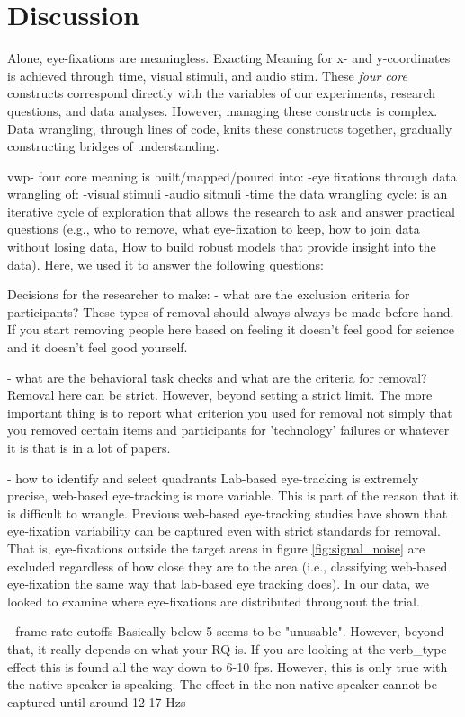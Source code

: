 \section{Discussion}
Alone, eye-fixations are meaningless. Exacting Meaning for x- and y-coordinates is achieved
through time, visual stimuli, and audio stim. These \textit{four core} constructs correspond directly with the variables of our experiments, research questions, and data analyses. However, managing these constructs is complex. Data wrangling, through lines of code, knits these constructs together, gradually constructing bridges of understanding.

vwp- four core
meaning is built/mapped/poured into:
-eye fixations
through data wrangling of:
-visual stimuli
-audio sitmuli
-time
the data wrangling cycle: is an iterative cycle of exploration that allows the research to ask and answer practical questions (e.g., who to remove, what eye-fixation to keep, how to join data without losing data, How to build robust models that provide insight into the data). Here, we used it to answer the following questions:


Decisions for the researcher to make:
- what are the exclusion criteria for participants?
These types of removal should always always be made before hand. If you start removing people here based on feeling it doesn't feel good for science and it doesn't feel good yourself. 


- what are the behavioral task checks and what are the criteria for removal?
Removal here can be strict. However, beyond setting a strict limit. The more important thing is to report what criterion you used for removal not simply that you removed certain items and participants for 'technology' failures or whatever it is that is in a lot of papers.


- how to identify and select quadrants
Lab-based eye-tracking is extremely precise, web-based eye-tracking is more variable. This is part of the reason that it is difficult to wrangle. Previous web-based eye-tracking studies have shown that eye-fixation variability can be captured even with strict standards for removal. That is, eye-fixations outside the target areas in figure \ref{fig:signal_noise} are excluded regardless of how close they are to the area (i.e., classifying web-based eye-fixation the same way that lab-based eye tracking does). In our data, we looked to examine where eye-fixations are distributed throughout the trial.

- frame-rate cutoffs
Basically below 5 seems to be "unusable". However, beyond that, it really depends on what your RQ is. If you are looking at the verb\_type effect this is found all the way down to 6-10 fps. However, this is only true with the native speaker is speaking. The effect in the non-native speaker cannot be captured until around 12-17 Hzs

